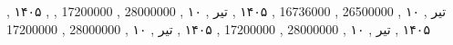  , ۱۴۰۵ , تیر , ۱۰ , 26500000 , 16736000 , ۱۴۰۵ , تیر , ۱۰ , 28000000 , 17200000 , ۱۴۰۵ , تیر , ۱۰ , 28000000 , 17200000 , ۱۴۰۵ , تیر , ۱۰ , 28000000 , 17200000 

